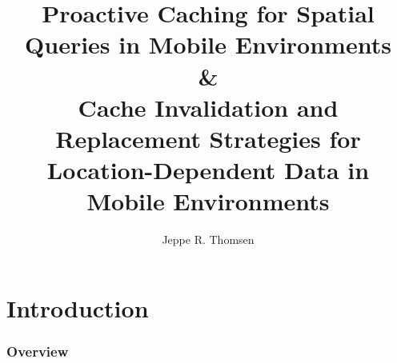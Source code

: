 \documentclass[t]{beamer}
\title[Fall Presentation 2010\hspace{14em}\insertframenumber/\inserttotalframenumber]{Proactive Caching for Spatial Queries in Mobile Environments \\\&\\ Cache Invalidation and Replacement Strategies for Location-Dependent Data in Mobile Environments}
\author[Jeppe R. Thomsen]{Jeppe R. Thomsen}%
\institute{Hong Kong Polytechnic University\\ Department of Computing}
\begin{document}
\begin{frame} %
\titlepage
\end{frame}

\section{Introduction} %

\begin{frame}[red]
\frametitle{Overview}
\Large

\end{frame}





%
%
%
%
\end{document}

